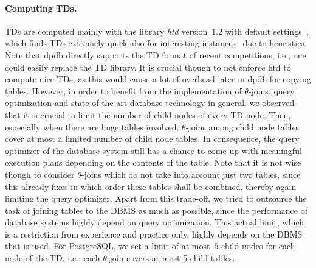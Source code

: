 \documentclass{llncs}
\newcommand{\dpdb}{{\small\textsf{dpdb}}\xspace}
\begin{document}
\paragraph*{Computing TDs.}
TDs are computed mainly with the library \emph{htd} version~1.2 with default
settings~\cite{AbseherMusliuWoltran17a}, which finds TDs extremely quick
also for interesting instances~\cite{FichteHecherZisser19} due to heuristics.
Note that \dpdb directly supports the TD format of recent competitions,
i.e., one could easily replace the TD library.
It is crucial though to not enforce htd to compute nice TDs, as this would cause a lot of overhead later in \dpdb for copying tables.
However, in order to benefit from the implementation of $\theta$-joins,
query optimization and state-of-the-art database technology in general, 
we observed that it is crucial to limit the number of child nodes of every TD node.
Then, especially when there are huge tables involved, $\theta$-joins among child node tables
cover at most a limited number of child node tables.
In consequence, the query optimizer of the database system still has a chance
to come up with meaningful execution plans depending on the contents of the table.
Note that it is not wise though to consider $\theta$-joins which do not take into account just two tables,
since this already fixes in which order these tables shall be combined,
thereby again limiting the query optimizer.
Apart from this trade-off, we tried to outsource the task of joining tables to the DBMS as much as possible, since the performance of database systems highly depend on query optimization. %
This actual limit, which is a restriction from experience and practice only, highly depends on the DBMS that is used.
For PostgreSQL, we set a limit of at most~$5$ child nodes for each node of the TD,
i.e., each $\theta$-join covers at most 5 child tables.
\end{document}
